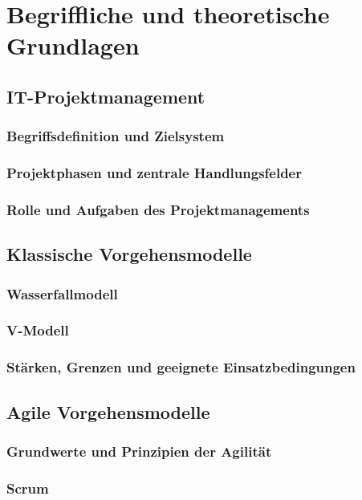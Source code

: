 \chapter{Begriffliche und theoretische Grundlagen}
\label{sec:Grundlagen}

\section{IT-Projektmanagement}
\label{sec:ITProjektmanagement}

\subsection{Begriffsdefinition und Zielsystem}
\subsection{Projektphasen und zentrale Handlungsfelder}
\subsection{Rolle und Aufgaben des Projektmanagements}

\section{Klassische Vorgehensmodelle}
\label{sec:KlassischeModelle}

\subsection{Wasserfallmodell}
\subsection{V-Modell}
\subsection{Stärken, Grenzen und geeignete Einsatzbedingungen}

\section{Agile Vorgehensmodelle}
\label{sec:AgileModelle}

\subsection{Grundwerte und Prinzipien der Agilität}
\subsection{Scrum}
